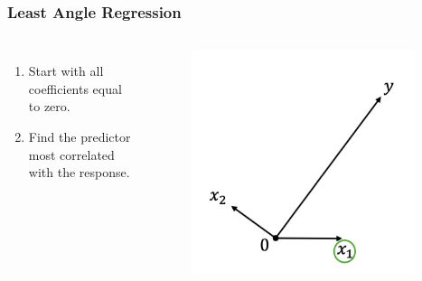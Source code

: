 \begin{frame}
\frametitle{Least Angle Regression}
\begin{columns}
    \begin{enumerate}
        \item Start with all coefficients equal to zero.
        \item Find the predictor most correlated with the response.
    \end{enumerate}
    
    \begin{figure}[!htbp]
        \begin{center}
            \includegraphics[width=0.95\textwidth]{img/LAR/2.jpeg}
        \end{center}
    \end{figure}
\end{columns}
\end{frame}

